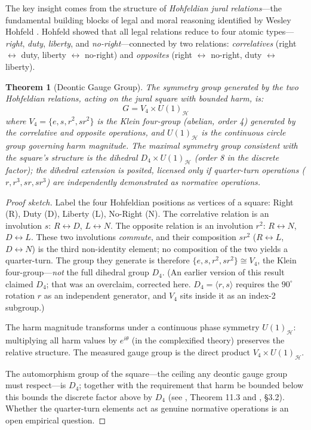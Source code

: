 \documentclass[12pt,letterpaper]{article}
\newtheorem{theorem}{Theorem}[section]
\theoremstyle{definition}
\theoremstyle{remark}
\newcommand{\harm}{\mathcal{H}}
\begin{document}
The key insight comes from the structure of \emph{Hohfeldian jural relations}---the fundamental building blocks of legal and moral reasoning identified by Wesley Hohfeld \cite{hohfeld1913}. Hohfeld showed that all legal relations reduce to four atomic types---\emph{right}, \emph{duty}, \emph{liberty}, and \emph{no-right}---connected by two relations: \emph{correlatives} (right $\leftrightarrow$ duty, liberty $\leftrightarrow$ no-right) and \emph{opposites} (right $\leftrightarrow$ no-right, duty $\leftrightarrow$ liberty).

\begin{theorem}[Deontic Gauge Group]
\label{thm:d4}
The symmetry group generated by the two Hohfeldian relations, acting on the jural square with bounded harm, is:
\begin{equation}
G = V_4 \times U(1)_\harm
\label{eq:gauge_group}
\end{equation}
where $V_4 = \{e, s, r^2, sr^2\}$ is the Klein four-group (abelian, order 4) generated by the correlative and opposite operations, and $U(1)_\harm$ is the continuous circle group governing harm magnitude. The maximal symmetry group consistent with the square's structure is the dihedral $D_4 \times U(1)_\harm$ (order 8 in the discrete factor); the dihedral extension is \emph{posited}, licensed only if quarter-turn operations ($r, r^3, sr, sr^3$) are independently demonstrated as normative operations.
\end{theorem}

\begin{proof}[Proof sketch]
Label the four Hohfeldian positions as vertices of a square: Right (R), Duty (D), Liberty (L), No-Right (N). The correlative relation is an involution $s$: $R \leftrightarrow D$, $L \leftrightarrow N$. The opposite relation is an involution $r^2$: $R \leftrightarrow N$, $D \leftrightarrow L$. These two involutions \emph{commute}, and their composition $sr^2$ ($R \leftrightarrow L$, $D \leftrightarrow N$) is the third non-identity element; no composition of the two yields a quarter-turn. The group they generate is therefore $\{e, s, r^2, sr^2\} \cong V_4$, the Klein four-group---\emph{not} the full dihedral group $D_4$. (An earlier version of this result claimed $D_4$; that was an overclaim, corrected here. $D_4 = \langle r, s \rangle$ requires the $90^\circ$ rotation $r$ as an independent generator, and $V_4$ sits inside it as an index-2 subgroup.)

The harm magnitude transforms under a continuous phase symmetry $U(1)_\harm$: multiplying all harm values by $e^{i\theta}$ (in the complexified theory) preserves the relative structure. The measured gauge group is the direct product $V_4 \times U(1)_\harm$.

The automorphism group of the square---the ceiling any deontic gauge group must respect---is $D_4$; together with the requirement that harm be bounded below this bounds the discrete factor above by $D_4$ (see \cite{bond2026geometric}, Theorem 11.3 and \cite{bond2026noether}, \S3.2). Whether the quarter-turn elements act as genuine normative operations is an open empirical question.
\end{proof}
\end{document}
